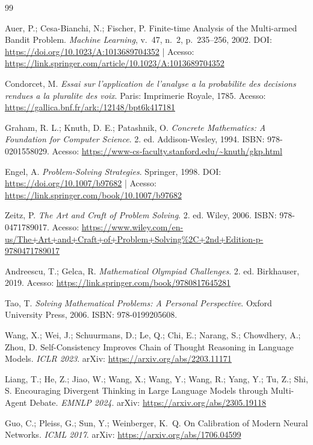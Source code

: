 \documentclass[5p]{elsarticle}
\theoremstyle{definition}
\begin{document}
\begin{thebibliography}{99}

Auer, P.; Cesa-Bianchi, N.; Fischer, P. Finite-time Analysis of the Multi-armed Bandit Problem. \textit{Machine Learning}, v.~47, n.~2, p.~235--256, 2002. DOI: \url{https://doi.org/10.1023/A:1013689704352} | Acesso: \url{https://link.springer.com/article/10.1023/A:1013689704352}

Condorcet, M. \textit{Essai sur l'application de l'analyse a la probabilite des decisions rendues a la pluralite des voix}. Paris: Imprimerie Royale, 1785. Acesso: \url{https://gallica.bnf.fr/ark:/12148/bpt6k417181}

Graham, R. L.; Knuth, D. E.; Patashnik, O. \textit{Concrete Mathematics: A Foundation for Computer Science}. 2. ed. Addison-Wesley, 1994. ISBN: 978-0201558029. Acesso: \url{https://www-cs-faculty.stanford.edu/~knuth/gkp.html}

Engel, A. \textit{Problem-Solving Strategies}. Springer, 1998. DOI: \url{https://doi.org/10.1007/b97682} | Acesso: \url{https://link.springer.com/book/10.1007/b97682}

Zeitz, P. \textit{The Art and Craft of Problem Solving}. 2. ed. Wiley, 2006. ISBN: 978-0471789017. Acesso: \url{https://www.wiley.com/en-us/The+Art+and+Craft+of+Problem+Solving\%2C+2nd+Edition-p-9780471789017}

Andreescu, T.; Gelca, R. \textit{Mathematical Olympiad Challenges}. 2. ed. Birkhauser, 2019. Acesso: \url{https://link.springer.com/book/9780817645281}

Tao, T. \textit{Solving Mathematical Problems: A Personal Perspective}. Oxford University Press, 2006. ISBN: 978-0199205608.

Wang, X.; Wei, J.; Schuurmans, D.; Le, Q.; Chi, E.; Narang, S.; Chowdhery, A.; Zhou, D. Self-Consistency Improves Chain of Thought Reasoning in Language Models. \textit{ICLR 2023}. arXiv: \url{https://arxiv.org/abs/2203.11171}

Liang, T.; He, Z.; Jiao, W.; Wang, X.; Wang, Y.; Wang, R.; Yang, Y.; Tu, Z.; Shi, S. Encouraging Divergent Thinking in Large Language Models through Multi-Agent Debate. \textit{EMNLP 2024}. arXiv: \url{https://arxiv.org/abs/2305.19118}

Guo, C.; Pleiss, G.; Sun, Y.; Weinberger, K.~Q. On Calibration of Modern Neural Networks. \textit{ICML 2017}. arXiv: \url{https://arxiv.org/abs/1706.04599}


\end{thebibliography}
\end{document}
